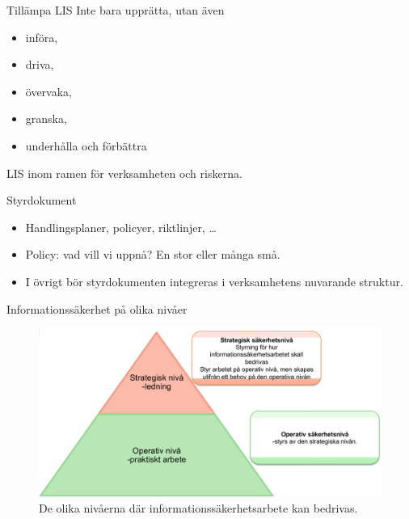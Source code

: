 \documentclass{beamer}
\begin{document}
\begin{frame}{Tillämpa LIS}
  Inte bara upprätta, utan även
  \begin{itemize}
    \item införa,
    \item driva,
    \item övervaka,
    \item granska,
    \item underhålla och förbättra
  \end{itemize}
  LIS inom ramen för verksamheten och riskerna.
\end{frame}

\begin{frame}{Styrdokument}
  \begin{itemize}
    \item Handlingsplaner, policyer, riktlinjer, \dots

    \item Policy: vad vill vi uppnå?
      En stor eller många små.

    \item I övrigt bör styrdokumenten integreras i verksamhetens nuvarande 
      struktur.

  \end{itemize}
\end{frame}

\begin{frame}{Informationssäkerhet på olika nivåer}
  \begin{figure}
    \includegraphics[width=\textwidth]{infosak-levels.png}
    \caption{De olika nivåerna där informationssäkerhetsarbete kan bedrivas.}
  \end{figure}
\end{frame}
\end{document}
